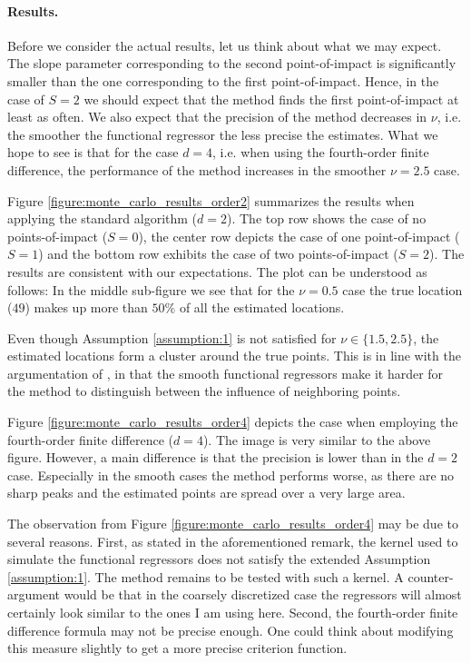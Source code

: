 \paragraph{Results.}

Before we consider the actual results, let us think about what we may expect. The slope
parameter corresponding to the second point-of-impact is significantly smaller than the
one corresponding to the first point-of-impact. Hence, in the case of $S = 2$ we should
expect that the method finds the first point-of-impact at least as often. We also expect
that the precision of the method decreases in $\nu$, i.e. the smoother the functional
regressor the less precise the estimates. What we hope to see is that for the case $d =
4$, i.e. when using the fourth-order finite difference, the performance of the method
increases in the smoother $\nu = 2.5$ case.

Figure \ref{figure:monte_carlo_results_order2} summarizes the results when applying the
standard algorithm ($d = 2$). The top row shows the case of no points-of-impact ($S =
0$), the center row depicts the case of one point-of-impact ($S = 1$) and the bottom row
exhibits the case of two points-of-impact ($S = 2$). The results are consistent with our
expectations. The plot can be understood as follows: In the middle sub-figure we see that
for the $\nu = 0.5$ case the true location ($49$) makes up more than $50\%$ of all the
estimated locations.

Even though Assumption \ref{assumption:1} is not satisfied for $\nu \in \{1.5, 2.5\}$,
the estimated locations form a cluster around the true points. This is in line with the
argumentation of \cite{Kneip2020}, in that the smooth functional regressors make it
harder for the method to distinguish between the influence of neighboring points.

Figure \ref{figure:monte_carlo_results_order4} depicts the case when employing the
fourth-order finite difference ($d = 4$). The image is very similar to the above figure.
However, a main difference is that the precision is lower than in the $d=2$ case.
Especially in the smooth cases the method performs worse, as there are no sharp
peaks and the estimated points are spread over a very large area.

The observation from Figure \ref{figure:monte_carlo_results_order4} may be due to
several reasons. First, as stated in the aforementioned remark, the kernel used to
simulate the functional regressors does not satisfy the extended Assumption
\ref{assumption:1}. The method remains to be tested with such a kernel. A
counter-argument would be that in the coarsely discretized case the regressors will
almost certainly look similar to the ones I am using here. Second, the fourth-order
finite difference formula may not be precise enough. One could think about modifying
this measure slightly to get a more precise criterion function.

